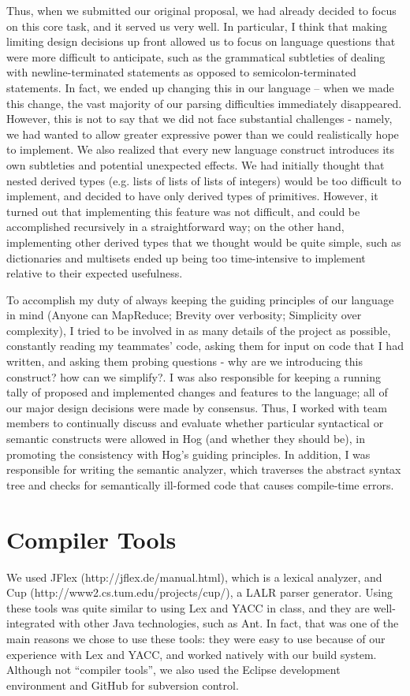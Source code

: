 \documentclass{report}
\begin{document}
Thus, when we submitted our original proposal, we had already decided to focus on this core task, and it served us very well. In particular, I think that making limiting design decisions up front allowed us to focus on language questions that were more difficult to anticipate, such as the grammatical subtleties of dealing with newline-terminated statements as opposed to semicolon-terminated statements. In fact, we ended up changing this in our language -- when we made this change, the vast majority of our parsing difficulties immediately disappeared. However, this is not to say that we did not face substantial challenges - namely, we had wanted to allow greater expressive power than we could realistically hope to implement. We also realized that every new language construct introduces its own subtleties and potential unexpected effects. We had initially thought that nested derived types (e.g. lists of lists of lists of integers) would be too difficult to implement, and decided to have only derived types of primitives. However, it turned out that implementing this feature was not difficult, and could be accomplished recursively in a straightforward way; on the other hand, implementing other derived types that we thought would be quite simple, such as dictionaries and multisets ended up being too time-intensive to implement relative to their expected usefulness.

To accomplish my duty of always keeping the guiding principles of our language in mind (Anyone can MapReduce; Brevity over verbosity; Simplicity over complexity), I tried to be involved in as many details of the project as possible, constantly reading my teammates' code, asking them for input on code that I had written, and asking them probing questions - why are we introducing this construct? how can we simplify?. I was also responsible for keeping a running tally of proposed and implemented changes and features to the language; all of our major design decisions were made by consensus. Thus, I worked with team members to continually discuss and evaluate whether particular syntactical or semantic constructs were allowed in Hog (and whether they should be), in promoting the consistency with Hog's guiding principles. In addition, I was responsible for writing the semantic analyzer, which traverses the abstract syntax tree and checks for semantically ill-formed code that causes compile-time errors.

\section{Compiler Tools}
We used JFlex (http://jflex.de/manual.html), which is a lexical analyzer, and Cup (http://www2.cs.tum.edu/projects/cup/), a LALR parser generator. Using these tools was quite similar to using Lex and YACC in class, and they are well-integrated with other Java technologies, such as Ant. In fact, that was one of the main reasons we chose to use these tools: they were easy to use because of our experience with Lex and YACC, and worked natively with our build system. Although not ``compiler tools'', we also used the Eclipse development environment and GitHub for subversion control.
\end{document}
